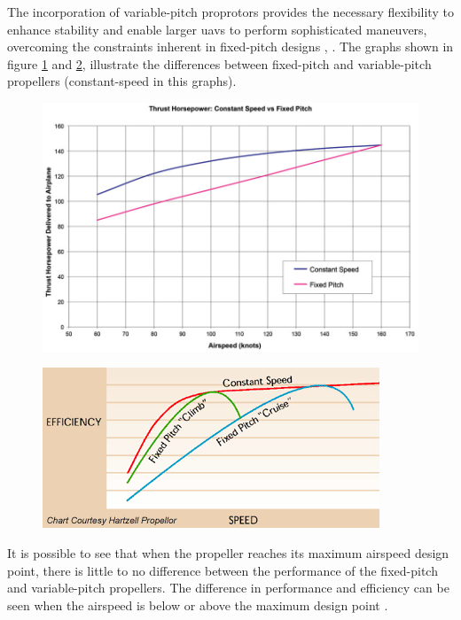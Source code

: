 The incorporation of variable-pitch proprotors provides the necessary flexibility to enhance stability and enable larger \glspl{uav} to perform sophisticated maneuvers, overcoming the constraints inherent in fixed-pitch designs \cite{FPP1}, \cite{VPP1}.
The graphs shown in figure \ref{fig:FPPvsVPP2} and \ref{fig:FPPvsVPP}, illustrate the differences between fixed-pitch and variable-pitch propellers (constant-speed in this graphs).

\begin{figure}[H]
    \centering
    \includegraphics[scale=0.45]{ch1/assests/FPPvsVPP2.jpg}
    \caption{\cite{VPP7}}
    \label{fig:FPPvsVPP2}
\end{figure}

\begin{figure}[H]
    \centering
    \includegraphics[scale=0.8]{ch1/assests/FPPvsVPP.png}
    \caption{\cite{VPP9}}
    \label{fig:FPPvsVPP}
\end{figure}

It is possible to see that when the propeller reaches its maximum airspeed design point, there is little to no difference between the performance of the fixed-pitch and variable-pitch propellers.
The difference in performance and efficiency can be seen when the airspeed is below or above the maximum design point \cite{VPP9}.

